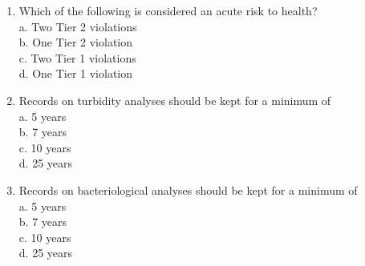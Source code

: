 \begin{enumerate}[1.]
\item Which of the following is considered an acute risk to health?\\
a. Two Tier 2 violations\\
b. One Tier 2 violation\\
c. Two Tier 1 violations\\
d. One Tier 1 violation\\
\item Records on turbidity analyses should be kept for a minimum of\\
a. 5 years\\
b. 7 years\\
c. 10 years\\
d. 25 years\\
\item Records on bacteriological analyses should be kept for a minimum of\\
a. 5 years\\
b. 7 years\\
c. 10 years\\
d. 25 years\\

\end{enumerate}


